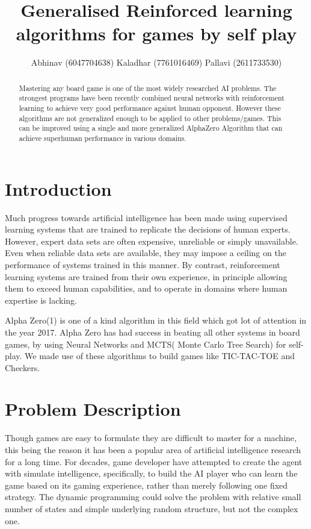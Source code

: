 \documentclass{article}
\title{Generalised Reinforced learning algorithms for games by self play}
\author{
    Abhinav (6047704638) \And
    Kaladhar (7761016469) \And
    Pallavi (2611733530)
}
\begin{document}
\maketitle

\begin{abstract}
  Mastering any board game is one of the most widely researched AI problems. The strongest programs have been recently combined neural networks with reinforcement learning to achieve very good performance against human opponent. However these algorithms are not generalized enough to be applied to other problems/games. This can be improved using a single and more generalized AlphaZero Algorithm that can achieve superhuman performance in various domains.
\end{abstract}

\section{Introduction}
    Much progress towards artificial intelligence has been made using supervised learning systems that are trained to replicate the decisions of human experts. However, expert data sets are often expensive, unreliable or simply unavailable. Even when reliable data sets are available, they may impose a ceiling on the performance of systems trained in this manner. By contrast, reinforcement learning systems are trained from their own experience, in principle allowing them to exceed human capabilities, and to operate in domains where human expertise is lacking.

    Alpha Zero(1) is one of a kind algorithm in this field which got lot of attention in the year 2017. Alpha Zero has had success in beating all other systems in board games, by using Neural Networks and MCTS( Monte Carlo Tree Search) for self-play. We made use of these algorithms to build games like TIC-TAC-TOE and Checkers.


\section{Problem Description}


Though games are easy to  formulate they are difficult to master for a machine, this being the reason it has been a popular area of artificial intelligence research for a long time. For decades, game developer have attempted to create the agent with simulate intelligence, specifically, to build the AI player who can learn the game based on its gaming experience, rather than merely following one fixed strategy. The dynamic programming could solve the problem with relative small number of states and simple underlying random structure, but not the complex one.
\end{document}
